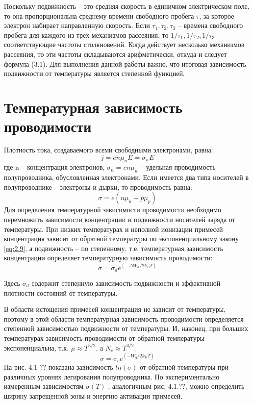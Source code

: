 Поскольку подвижность – это средняя скорость в единичном электрическом поле, то она пропорциональна среднему времени
свободного пробега $\tau$, за которое электрон набирает направленную скорость. Если $\tau_1, \tau_2,\tau_3$ – времена свободного
пробега для каждого из трех механизмов рассеяния, то $1/\tau_1,1/\tau_2,1/\tau_3$ – соответствующие частоты столкновений. Когда
действует несколько механизмов рассеяния, то эти частоты складываются арифметически, откуда и следует формула (3.1). Для
выполнения данной работы важно, что итоговая зависимость подвижности от температуры является степенной функцией.

\section{Температурная зависимость проводимости}
Плотность тока, создаваемого всеми свободными электронами, равна:
\begin{equation}
	j=e n \mu_{n} E=\sigma_{n} E
	\label{eq:4.1}
\end{equation}
где n – концентрация электронов, $\sigma_n = e n \mu_n$ – удельная проводимость полупроводника, обусловленная электронами.
Если имеется два типа носителей в полупроводнике – электроны и дырки,
то проводимость равна:
\begin{equation}
	\sigma=e\left(n \mu_{n}+p \mu_{p}\right)
	\label{eq:4.2}
\end{equation}
Для определения температурной зависимости проводимости необходимо перемножить зависимости концентрации и подвижности носителей заряда от
температуры. При низких температурах и неполной ионизации примесей концентрация зависит от обратной температуры по экспоненциальному закону
\eqref{eq:2.9}, а подвижность – по степенному, т.е. температурная зависимость концентрации определяет температурную зависимость проводимости:
\begin{equation}
	\sigma=\sigma_{d} e^{\left(-\Delta W_{d} / 2 k_{B} T\right)}
	\label{eq:4.3}
\end{equation}

Здесь $\sigma_d$ содержит степенную зависимость подвижности и эффективной плотности состояний от температуры.

В области истощения примесей концентрация не зависит от температуры, поэтому в этой области температурная зависимость проводимости определяется
степенной зависимостью подвижности от температуры. И, наконец, при больших температурах зависимость проводимости от
обратной температуры экспоненциальна, т.к. $\mu \approx T^{3/2}$, а  $N_c \approx T^{3/2}$:
 \begin{equation}
	\sigma=\sigma_{c} e^{\left(-W_{g} / 2 k_{B} T\right)}
	 \label{eq:4.4}
 \end{equation}
 На рис. 4.1 ?? показана зависимость $ln(\sigma)$ от обратной температуры при различных уровнях легирования полупроводника. По
 экспериментально измеренным зависимостям $\sigma(T)$ , аналогичным рис. 4.1.??, можно определить ширину запрещенной зоны и
 энергию активации примесей. 

